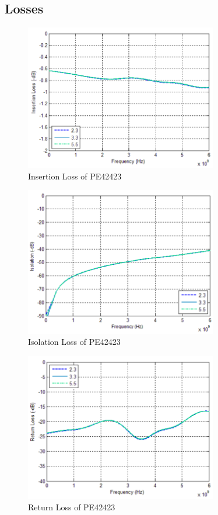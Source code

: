 \documentclass[12pt,openany,a4paper]{book}
\begin{document}
\subsection{Losses}
\begin{figure}[H]
	\centering
    \includegraphics[width=0.75\textwidth]{pe42423-datasheet-insertion.png}
	\caption{Insertion Loss of PE42423}
	\label{fig:pe42423-insertion}
\end{figure} 
\begin{figure}[H]
	\centering
    \includegraphics[width=0.75\textwidth]{pe42423-datasheet-isolation.png}
	\caption{Isolation Loss of PE42423}
	\label{fig:pe42423-isolation}
\end{figure} 
\begin{figure}[H]
	\centering
    \includegraphics[width=0.75\textwidth]{pe42423-datasheet-return.png}
	\caption{Return Loss of PE42423}
	\label{fig:pe42423-return}
\end{figure} 
\end{document}
